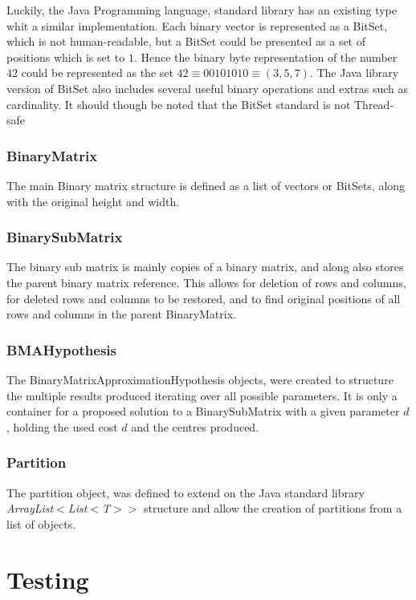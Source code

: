 \documentclass[a4paper]{article}
\begin{document}
Luckily, the Java Programming language, standard library has an existing type whit a similar
implementation. Each binary vector is represented as a BitSet, which is not human-readable, but
a BitSet could be presented as a set of positions which is set to $1$. Hence the binary byte
representation of the number $42$ could be represented as the set
$42 \equiv 00101010 \equiv (3,5,7)$. The Java library version of BitSet also includes several
useful binary operations and extras such as cardinality. It should though be noted that the
BitSet standard is not Thread-safe \cite{bitset_java_17_2021}

\subsubsection{BinaryMatrix}
The main Binary matrix structure is defined as a list of vectors or BitSets, along with the
original height and width.

\subsubsection{BinarySubMatrix}
The binary sub matrix is mainly copies of a binary matrix, and along also stores the parent
binary matrix reference. This allows for deletion of rows and columns, for deleted rows and
columns to be restored, and to find original positions of all rows and columns in the parent
BinaryMatrix.

\subsubsection{BMAHypothesis}
The BinaryMatrixApproximationHypothesis objects, were created to structure the multiple
results produced iterating over all possible parameters. It is only a container for a
proposed solution to a BinarySubMatrix with a given parameter $d$, holding the used cost $d$
and the centres produced.

\subsubsection{Partition}
The partition object, was defined to extend on the Java standard library \textit{ArrayList$<$List$<$T$>>$}
structure and allow the creation of partitions from a list of objects.


%
%
\newpage

\section{Testing}
\end{document}
